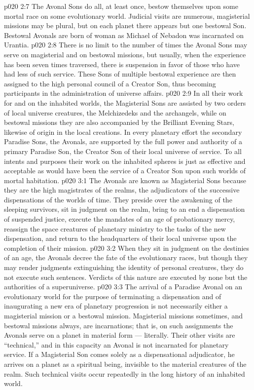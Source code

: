 \vs p020 2:7 \pc {}\bibnobreakspace {} The Avonal Sons do all, at least once, bestow themselves upon some mortal race on some evolutionary world. Judicial visits are numerous, magisterial missions may be plural, but on each planet there appears but one bestowal Son. Bestowal Avonals are born of woman as Michael of Nebadon was incarnated on Urantia.
\vs p020 2:8 \pc There is no limit to the number of times the Avonal Sons may serve on magisterial and on bestowal missions, but usually, when the experience has been seven times traversed, there is suspension in favor of those who have had less of such service. These Sons of multiple bestowal experience are then assigned to the high personal council of a Creator Son, thus becoming participants in the administration of universe affairs.
\vs p020 2:9 In all their work for and on the inhabited worlds, the Magisterial Sons are assisted by two orders of local universe creatures, the Melchizedeks and the archangels, while on bestowal missions they are also accompanied by the Brilliant Evening Stars, likewise of origin in the local creations. In every planetary effort the secondary Paradise Sons, the Avonals, are supported by the full power and authority of a primary Paradise Son, the Creator Son of their local universe of service. To all intents and purposes their work on the inhabited spheres is just as effective and acceptable as would have been the service of a Creator Son upon such worlds of mortal habitation.
\vs p020 3:1 The Avonals are known as Magisterial Sons because they are the high magistrates of the realms, the adjudicators of the successive dispensations of the worlds of time. They preside over the awakening of the sleeping survivors, sit in judgment on the realm, bring to an end a dispensation of suspended justice, execute the mandates of an age of probationary mercy, reassign the space creatures of planetary ministry to the tasks of the new dispensation, and return to the headquarters of their local universe upon the completion of their mission.
\vs p020 3:2 When they sit in judgment on the destinies of an age, the Avonals decree the fate of the evolutionary races, but though they may render judgments extinguishing the identity of personal creatures, they do not execute such sentences. Verdicts of this nature are executed by none but the authorities of a superuniverse.
\vs p020 3:3 The arrival of a Paradise Avonal on an evolutionary world for the purpose of terminating a dispensation and of inaugurating a new era of planetary progression is not necessarily either a magisterial mission or a bestowal mission. Magisterial missions sometimes, and bestowal missions always, are incarnations; that is, on such assignments the Avonals serve on a planet in material form --- literally. Their other visits are “technical,” and in this capacity an Avonal is not incarnated for planetary service. If a Magisterial Son comes solely as a dispensational adjudicator, he arrives on a planet as a spiritual being, invisible to the material creatures of the realm. Such technical visits occur repeatedly in the long history of an inhabited world.
